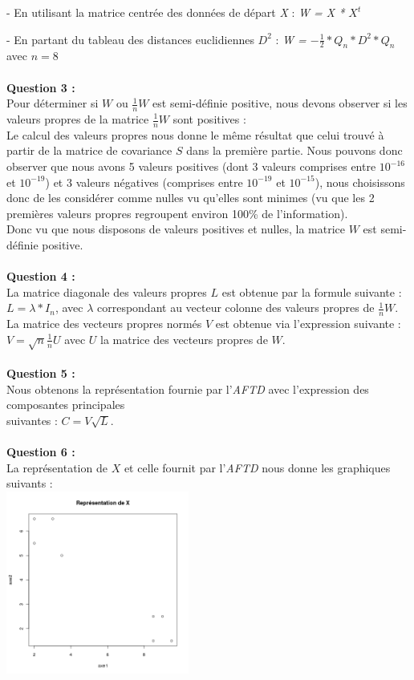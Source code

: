 \documentclass[a4paper, 10pt]{article}
\begin{document}
- En utilisant la matrice centrée des données de départ \textit{X} : \textit{W = X * $X^{t}$}

- En partant du tableau des distances euclidiennes \textit{$D^{2}$} : \textit{W = $-\frac{1}{2} * Q_{n} * D^{2} * Q_{n}$} avec $n = 8$\\ \\
\textbf{Question 3 :}\\
Pour déterminer si $W$ ou $\frac{1}{n}W$ est semi-définie positive, nous devons observer si les valeurs propres de la matrice $\frac{1}{n}W$
sont positives :\\
Le calcul des valeurs propres nous donne le même résultat que celui trouvé à partir de la matrice de covariance $S$ dans la première partie.
Nous pouvons donc observer que nous avons 5 valeurs positives (dont 3 valeurs comprises entre $10^{-16}$ et $10^{-19}$) et
3 valeurs négatives (comprises entre $10^{-19}$ et $10^{-15}$), nous choisissons donc de les considérer comme nulles vu qu'elles sont minimes
(vu que les 2 premières valeurs propres regroupent environ 100\% de l'information).\\
Donc vu que nous disposons de valeurs positives et nulles, la matrice $W$ est semi-définie positive.\\ \\
\textbf{Question 4 :}\\
La matrice diagonale des valeurs propres $L$ est obtenue par la formule suivante : $L = \lambda * I_{n}$, avec $\lambda$ correspondant
au vecteur colonne des valeurs propres de $\frac{1}{n}W$.\\
La matrice des vecteurs propres normés $V$ est obtenue via l'expression suivante : $V = \sqrt{n}\frac{1}{n}U$ avec $U$ la matrice des vecteurs
propres de $W$.\\ \\
\textbf{Question 5 :}\\
Nous obtenons la représentation fournie par l'\textit{AFTD} avec l'expression des composantes principales\\suivantes : $C = V\sqrt{L}$.\\ \\
\textbf{Question 6 :}\\
La représentation de $X$ et celle fournit par l'\textit{AFTD} nous donne les graphiques suivants :\\
\includegraphics[height = 6cm, width = 6cm]{plots/plot_exo1.png}
\end{document}
